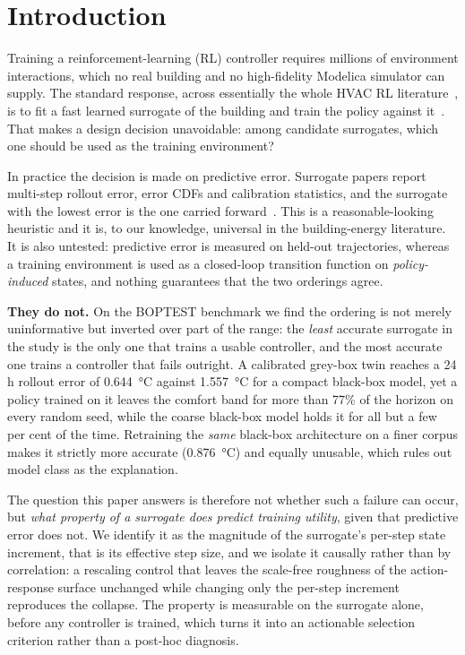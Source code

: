 \documentclass[energies,article,submit,moreauthors]{Definitions/mdpi}
\begin{document}
\section{Introduction}

Training a reinforcement-learning (RL) controller requires millions of environment interactions,
which no real building and no high-fidelity Modelica simulator can supply. The standard response,
across essentially the whole HVAC RL literature~\cite{AlSayed2024Review,Nguyen2024Modelling}, is to
fit a fast learned surrogate of the building and train the policy against
it~\cite{HouEvins2024,Mshragi2026FastML}. That makes a design decision unavoidable: among candidate
surrogates, which one should be used as the training environment?

In practice the decision is made on predictive error. Surrogate papers report multi-step rollout
error, error CDFs and calibration statistics, and the surrogate with the lowest error is the one
carried forward~\cite{Bacher2011RCIdentification,Bunning2020RC,Chen2018NeuralODE,Raissi2019PINN,Hedayat2025PINN}.
This is a reasonable-looking heuristic and it is, to our knowledge, universal in the building-energy
literature. It is also untested: predictive error is measured on held-out trajectories, whereas a
training environment is used as a closed-loop transition function on \emph{policy-induced} states,
and nothing guarantees that the two orderings agree.

\textbf{They do not.} On the BOPTEST benchmark we find the ordering is not merely uninformative but
inverted over part of the range: the \emph{least} accurate surrogate in the study is the only one
that trains a usable controller, and the most accurate one trains a controller that fails outright.
A calibrated grey-box twin reaches a 24 h rollout error of \SI{0.644}{\celsius} against
\SI{1.557}{\celsius} for a compact black-box model, yet a policy trained on it leaves the comfort
band for more than 77\% of the horizon on every random seed, while the coarse black-box model holds
it for all but a few per cent of the time. Retraining the \emph{same} black-box
architecture on a finer corpus makes it strictly more accurate (\SI{0.876}{\celsius}) and equally
unusable, which rules out model class as the explanation.

The question this paper answers is therefore not whether such a failure can occur, but \emph{what
property of a surrogate does predict training utility}, given that predictive error does not. We
identify it as the magnitude of the surrogate's per-step state increment, that is its effective step
size, and we isolate it causally
rather than by correlation: a rescaling control that leaves the scale-free roughness of the
action-response surface unchanged while changing only the per-step increment reproduces the collapse.
The property is measurable on the surrogate alone, before any controller is trained, which turns it
into an actionable selection criterion rather than a post-hoc diagnosis.
\end{document}
